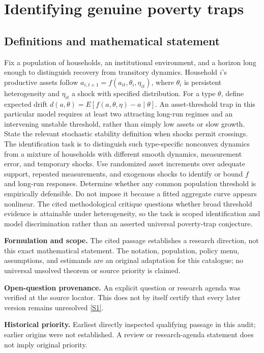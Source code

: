 \documentclass[11pt]{article}
\newcommand{\sref}[2]{\hyperlink{source:#1:#2}{[S#2]}}
\begin{document}
\section*{Identifying genuine poverty traps}\label{30007652}
\subsection{Definitions and mathematical statement}
Fix a population of households, an institutional environment, and a horizon long enough to distinguish recovery from transitory dynamics. Household \(i\)'s productive assets follow \(a_{i,t+1}=f(a_{it},\theta_i,\eta_{it})\), where \(\theta_i\) is persistent heterogeneity and \(\eta_{it}\) a shock with specified distribution. For a type \(\theta\), define expected drift \(d(a,\theta)=E[f(a,\theta,\eta)-a\mid\theta]\). An asset-threshold trap in this particular model requires at least two attracting long-run regimes and an intervening unstable threshold, rather than simply low assets or slow growth. State the relevant stochastic stability definition when shocks permit crossings. The identification task is to distinguish such type-specific nonconvex dynamics from a mixture of households with different smooth dynamics, measurement error, and temporary shocks. Use randomized asset increments over adequate support, repeated measurements, and exogenous shocks to identify or bound \(f\) and long-run responses. Determine whether any common population threshold is empirically defensible. Do not impose it because a fitted aggregate curve appears nonlinear. The cited methodological critique questions whether broad threshold evidence is attainable under heterogeneity, so the task is scoped identification and model discrimination rather than an asserted universal poverty-trap conjecture.

\par\textbf{Formulation and scope.} The cited passage establishes a research direction, not this exact mathematical statement. The notation, population, policy menu, assumptions, and estimands are an original adaptation for this catalogue; no universal unsolved theorem or source priority is claimed.

\par\textbf{Open-question provenance.} An explicit question or research agenda was verified at the source locator. This does not by itself certify that every later version remains unresolved \sref{30007652}{1}.

\par\textbf{Historical priority.} Earliest directly inspected qualifying passage in this audit; earlier origins were not established. A review or research-agenda statement does not imply original priority.
\end{document}
